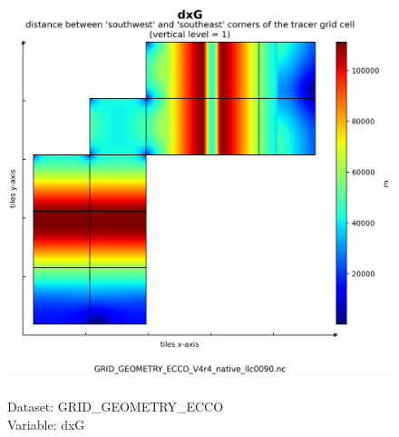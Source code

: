 \begin{figure}[H]
\centering
\includegraphics[scale=0.5]{../images/plots/native_plots_coords/Geometry_Parameters_for_the_Lat-Lon-Cap_90_(llc90)_Native_Model_Grid_(Version_4_Release_4)/dxG.png}
\caption{\\Dataset: GRID\_GEOMETRY\_ECCO\\Variable: dxG}
\label{tab:table-GRID_GEOMETRY_ECCO_dxG-Plot}
\end{figure}
\pagebreak
